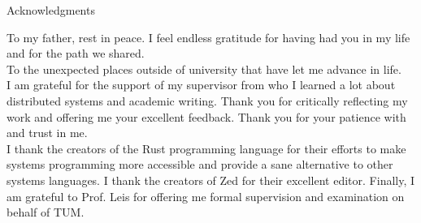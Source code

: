 \thispagestyle{empty}

\vspace*{20mm}

\begin{center}
    { Acknowledgments}
\end{center}

\vspace{10mm}

To my father, rest in peace.
I feel endless gratitude for having had you in my life and for the path we shared.\\

To the unexpected places outside of university that have let me advance in life.\\

I am grateful for the support of my supervisor \getAdvisor{}
from who I learned a lot about distributed systems and academic writing.
Thank you for critically reflecting my work and offering me your excellent feedback.
Thank you for your patience with and trust in me.\\

I thank the creators of the Rust programming language for their efforts
to make systems programming more accessible and provide a sane alternative
to other systems languages.
I thank the creators of Zed for their excellent editor.
Finally, I am grateful to Prof. Leis for offering me formal supervision
and examination on behalf of TUM.

\cleardoublepage{}
